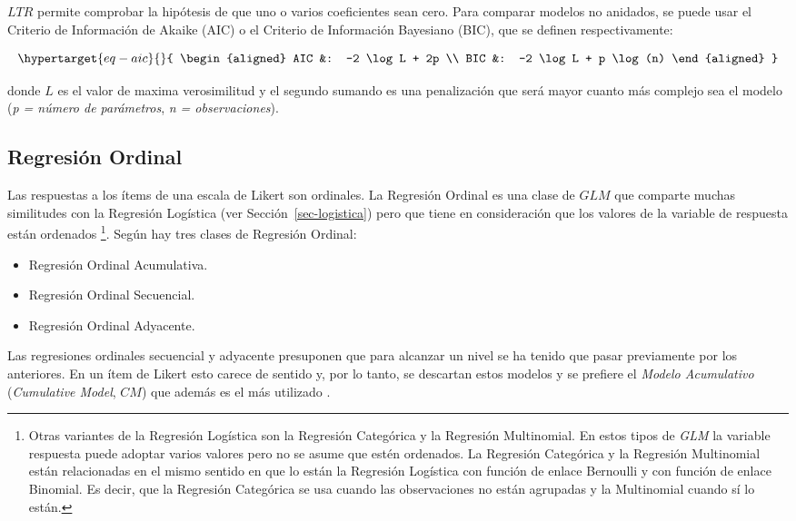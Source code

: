\documentclass[
  12pt,
  a4paper,
  extrafontsizes,
  onecolumn,
  openright,
  table]{memoir}
\providecommand{\tightlist}{%
  \setlength{\itemsep}{0pt}\setlength{\parskip}{0pt}}\usepackage{longtable,booktabs,array}
\begin{document}
\(LTR\) permite comprobar la hipótesis de que uno o varios coeficientes
sean cero. Para comparar modelos no anidados, se puede usar el Criterio
de Información de Akaike (AIC) o el Criterio de Información Bayesiano
(BIC), que se definen respectivamente:

\begin{equation}\protect\hypertarget{eq-aic}{}{
\begin{aligned}
AIC &: -2 \log L + 2p \\
BIC &: -2 \log L + p \log(n)
\end{aligned}
}\label{eq-aic}\end{equation}

donde \(L\) es el valor de maxima verosimilitud y el segundo sumando es
una penalización que será mayor cuanto más complejo sea el modelo
(\emph{p = número de parámetros}, \emph{n = observaciones}).

\hypertarget{sec-ordinal}{%
\subsection{Regresión Ordinal}\label{sec-ordinal}}

Las respuestas a los ítems de una escala de Likert son ordinales. La
\gls{Regresión Ordinal} es una clase de \(GLM\) que comparte muchas
similitudes con la Regresión Logística (ver Sección~\ref{sec-logistica})
pero que tiene en consideración que los valores de la variable de
respuesta están ordenados \footnote{Otras variantes de la Regresión
  Logística son la Regresión Categórica y la Regresión Multinomial. En
  estos tipos de \emph{GLM} la variable respuesta puede adoptar varios
  valores pero no se asume que estén ordenados. La Regresión Categórica
  y la Regresión Multinomial están relacionadas en el mismo sentido en
  que lo están la Regresión Logística con función de enlace Bernoulli y
  con función de enlace Binomial. Es decir, que la Regresión Categórica
  se usa cuando las observaciones no están agrupadas y la Multinomial
  cuando sí lo están.}. Según \textcite[pp.~3-11]{burkner2019} hay tres
clases de Regresión Ordinal:

\begin{itemize}
\tightlist
\item
  Regresión Ordinal Acumulativa.
\item
  Regresión Ordinal Secuencial.
\item
  Regresión Ordinal Adyacente.
\end{itemize}

Las regresiones ordinales secuencial y adyacente presuponen que para
alcanzar un nivel se ha tenido que pasar previamente por los anteriores.
En un ítem de Likert esto carece de sentido y, por lo tanto, se
descartan estos modelos y se prefiere el \emph{Modelo Acumulativo}
(\emph{Cumulative Model}, \(CM\)) que además es el más utilizado
\autocite[ver][pp.~23-24]{burkner2019}.
\end{document}
